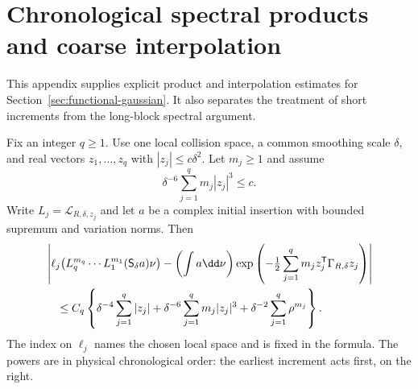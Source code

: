 \section{Chronological spectral products and coarse interpolation}
\label{app:functional-details}
This appendix supplies explicit product and interpolation estimates for
Section~\ref{sec:functional-gaussian}. It also separates the treatment
of short increments from the long-block spectral argument.

\begin{lemma}
\label{lem:chronological-product}
Fix an integer $q\ge1$. Use one local collision space, a common smoothing
scale $\delta$, and real vectors $z_1,\ldots,z_q$ with
$|z_j|\le c\delta^2$. Let $m_j\ge1$ and assume
\[
 \delta^{-6}\sum_{j=1}^q m_j|z_j|^3\le c.
\]
Write $L_j=\mathcal L_{R,\delta,z_j}$ and let $a$ be a complex initial
insertion with bounded supremum and variation norms. Then
\begin{align}
 &\left|\ell_j\bigl(L_q^{m_q}\cdots L_1^{m_1}
                   (\mathsf S_\delta a)\nu\bigr)
       -\left(\int a\dd\nu\right)
       \exp\left(-\tfrac12\sum_{j=1}^q
                      m_j z_j^{\mathsf T}\Gamma_{R,\delta}z_j\right)
        \right|\notag\\
 &\quad\le C_q\left\{
       \delta^{-4}\sum_{j=1}^q|z_j|
       +\delta^{-6}\sum_{j=1}^qm_j|z_j|^3
       +\delta^{-2}\sum_{j=1}^q\rho^{m_j}\right\}.
       \label{eq:chronological-product-bound}
\end{align}
The index on $\ell_j$ names the chosen local space and is fixed in the
formula. The powers are in physical chronological order: the earliest
increment acts first, on the right.
\end{lemma}
